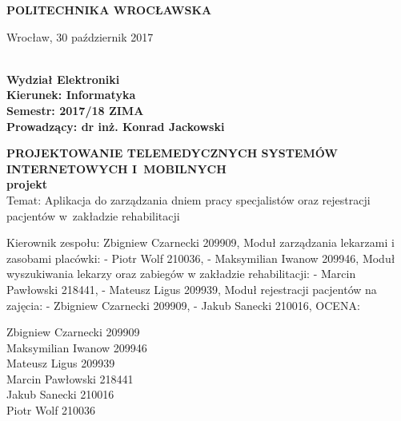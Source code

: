 \begin{titlepage}
	
	\begin{center}
		\huge{\uppercase{\textbf{Politechnika Wrocławska}}}
	\end{center}

	\begin{flushright}
		Wrocław, 30 październik 2017
	\end{flushright}

	\vspace{2cm}
	\begin{flushleft}
		\textbf{\\
			Wydział Elektroniki\\
			Kierunek: Informatyka\\
			Semestr: 2017/18 ZIMA\\
			Prowadzący: dr inż. Konrad Jackowski \\
		}
	\end{flushleft}
	
	\vspace{2cm}
	\begin{center}
		\textbf{
			\huge{\uppercase{Projektowanie telemedycznych systemów internetowych i~mobilnych}}\\
			\LARGE{projekt}
		}\\
		\huge{Temat: Aplikacja do zarządzania dniem pracy specjalistów oraz rejestracji pacjentów w~zakładzie rehabilitacji}
	\end{center}
	
	\vspace{10cm}
	Kierownik zespołu: Zbigniew Czarnecki 209909,
	Moduł zarządzania lekarzami i zasobami placówki:
	- Piotr Wolf 210036,
	- Maksymilian Iwanow 209946,
	Moduł wyszukiwania lekarzy oraz zabiegów w zakładzie rehabilitacji:
	- Marcin Pawłowski 218441,
	- Mateusz Ligus 209939,
	Moduł rejestracji pacjentów na zajęcia:
	- Zbigniew Czarnecki 209909,
	- Jakub Sanecki 210016,
	OCENA:

	\begin{multicols}{2}
		Zbigniew Czarnecki \hspace*{1cm} 209909 \\
		Maksymilian Iwanow \hspace*{1cm} 209946 \\
		Mateusz Ligus \hspace*{1cm} 209939 \\
		\columnbreak
		Marcin Pawłowski \hspace*{1cm} 218441 \\
		Jakub Sanecki \hspace*{1cm} 210016 \\		
		Piotr Wolf \hspace*{1cm} 210036 \\
	\end{multicols}

	\begin{tabular}
		
	\end{tabular}

\end{titlepage}
